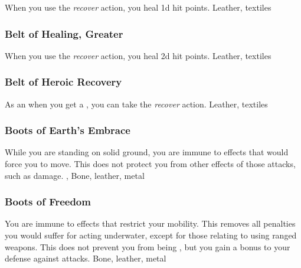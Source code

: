 When you use the \textit{recover} action, you heal \plus1d hit points.
 
 Leather, textiles
\lowercase{\hypertarget{item:Belt of Healing, Greater}{}}\label{item:Belt of Healing, Greater}
\hypertarget{item:Belt of Healing, Greater}{\subsubsection{Belt of Healing, Greater\hfill{}}}
When you use the \textit{recover} action, you heal \plus2d hit points.
 
 Leather, textiles
\lowercase{\hypertarget{item:Belt of Heroic Recovery}{}}\label{item:Belt of Heroic Recovery}
\hypertarget{item:Belt of Heroic Recovery}{\subsubsection{Belt of Heroic Recovery\hfill{}}}
As an  when you get a , you can take the \textit{recover} action.
 
 Leather, textiles
\lowercase{\hypertarget{item:Boots of Earth's Embrace}{}}\label{item:Boots of Earth's Embrace}
\hypertarget{item:Boots of Earth's Embrace}{\subsubsection{Boots of Earth's Embrace\hfill{}}}
While you are standing on solid ground, you are immune to effects that would force you to move.
This does not protect you from other effects of those attacks, such as damage.
 , 
 Bone, leather, metal
\lowercase{\hypertarget{item:Boots of Freedom}{}}\label{item:Boots of Freedom}
\hypertarget{item:Boots of Freedom}{\subsubsection{Boots of Freedom\hfill{}}}
You are immune to effects that restrict your mobility.
This removes all penalties you would suffer for acting underwater, except for those relating to using ranged weapons.
This does not prevent you from being \grappled, but you gain a  bonus to your defense against  attacks.
 
 Bone, leather, metal
\lowercase{\hypertarget{item:Boots of Freedom, Greater}{}}\label{item:Boots of Freedom, Greater}
